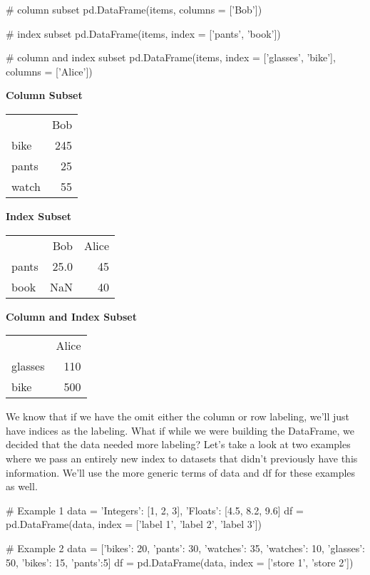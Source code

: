 \documentclass{article}
\begin{document}
\begin{python}
	# column subset
	pd.DataFrame(items, columns = ['Bob'])
	
	# index subset
	pd.DataFrame(items, index = ['pants', 'book'])
	
	# column and index subset
	pd.DataFrame(items, index = ['glasses', 'bike'], columns = ['Alice'])
\end{python}

\textbf{Column Subset}
\begin{center}
\begin{tabular}{lr}
	{} &  Bob \\
	bike  &  245 \\
	pants &   25 \\
	watch &   55 \\
\end{tabular}
\end{center}

\textbf{Index Subset}
\begin{center}
\begin{tabular}{lrr}
	{} &   Bob &  Alice \\
	pants &  25.0 &     45 \\
	book  &   NaN &     40 \\
\end{tabular}
\end{center}

\textbf{Column and Index Subset}
\begin{center}
\begin{tabular}{lr}
	{} &  Alice \\
	glasses &    110 \\
	bike    &    500 \\
\end{tabular}
\end{center}

We know that if we have the omit either the column or row labeling, we'll just have indices as the labeling. What if while we were building the DataFrame, we decided that the data needed more labeling? Let's take a look at two examples where we pass an entirely new index to datasets that didn't previously have this information. We'll use the more generic terms of data and df for these examples as well.

\begin{python}
	# Example 1
	data = {'Integers': [1, 2, 3], 'Floats': [4.5, 8.2, 9.6]}
	df = pd.DataFrame(data, index = ['label 1', 'label 2', 'label 3'])
	
	# Example 2
	data = [{'bikes': 20, 'pants': 30, 'watches': 35},
	{'watches': 10, 'glasses': 50, 'bikes': 15, 'pants':5}]
	df = pd.DataFrame(data, index = ['store 1', 'store 2'])
\end{python}
\end{document}
